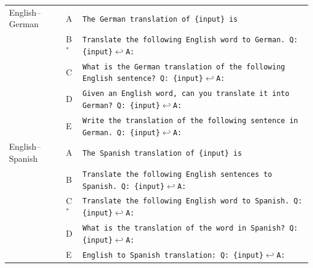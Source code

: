 {\begin{longtable}{@{}ll>{\raggedright\arraybackslash}p{}@{}}
English--German & A & \texttt{The German translation of \{input\} is} \\
 & B$^\ast$ & \texttt{Translate the following English word to German. Q: \{input\}$\hookleftarrow$A:} \\
 & C & \texttt{What is the German translation of the following English sentence? Q: \{input\}$\hookleftarrow$A:} \\
 & D & \texttt{Given an English word, can you translate it into German? Q: \{input\}$\hookleftarrow$A:} \\
 & E & \texttt{Write the translation of the following sentence in German. Q: \{input\}$\hookleftarrow$A:} \\[3pt]
English--Spanish & A & \texttt{The Spanish translation of \{input\} is} \\
 & B & \texttt{Translate the following English sentences to Spanish. Q: \{input\}$\hookleftarrow$A:} \\
 & C$^\ast$ & \texttt{Translate the following English word to Spanish. Q: \{input\}$\hookleftarrow$A:} \\
 & D & \texttt{What is the translation of the word in Spanish? Q: \{input\}$\hookleftarrow$A:} \\
 & E & \texttt{English to Spanish translation: Q: \{input\}$\hookleftarrow$A:} \\[3pt]
\end{longtable}
}
